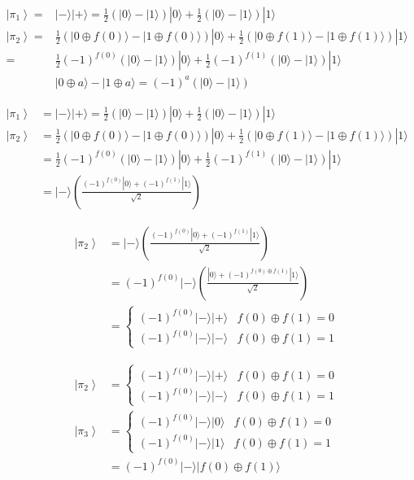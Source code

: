 \documentclass{book}
\begin{document}
$$
\begin{aligned}
	\left|\pi_1\right\rangle= & |-\rangle|+\rangle=\frac{1}{2}(|0\rangle-|1\rangle)|0\rangle+\frac{1}{2}(|0\rangle-|1\rangle)|1\rangle \\
	\left|\pi_2\right\rangle= & \frac{1}{2}(|0 \oplus f(0)\rangle-|1 \oplus f(0)\rangle)|0\rangle+\frac{1}{2}(|0 \oplus f(1)\rangle-|1 \oplus f(1)\rangle)|1\rangle \\
	= & \frac{1}{2}(-1)^{f(0)}(|0\rangle-|1\rangle)|0\rangle+\frac{1}{2}(-1)^{f(1)}(|0\rangle-|1\rangle)|1\rangle \\
	& |0 \oplus a\rangle-|1 \oplus a\rangle=(-1)^a(|0\rangle-|1\rangle)
\end{aligned}
$$

$$
\begin{aligned}
	\left|\pi_1\right\rangle & =|-\rangle|+\rangle=\frac{1}{2}(|0\rangle-|1\rangle)|0\rangle+\frac{1}{2}(|0\rangle-|1\rangle)|1\rangle \\
	\left|\pi_2\right\rangle & =\frac{1}{2}(|0 \oplus f(0)\rangle-|1 \oplus f(0)\rangle)|0\rangle+\frac{1}{2}(|0 \oplus f(1)\rangle-|1 \oplus f(1)\rangle)|1\rangle \\
	& =\frac{1}{2}(-1)^{f(0)}(|0\rangle-|1\rangle)|0\rangle+\frac{1}{2}(-1)^{f(1)}(|0\rangle-|1\rangle)|1\rangle \\
	& =|-\rangle\left(\frac{(-1)^{f(0)}|0\rangle+(-1)^{f(1)}|1\rangle}{\sqrt{2}}\right)
\end{aligned}
$$

$$
\begin{aligned}
	\left|\pi_2\right\rangle & =|-\rangle\left(\frac{(-1)^{f(0)}|0\rangle+(-1)^{f(1)}|1\rangle}{\sqrt{2}}\right) \\
	& =(-1)^{f(0)}|-\rangle\left(\frac{|0\rangle+(-1)^{f(0) \oplus f(1)}|1\rangle}{\sqrt{2}}\right) \\
	& = \begin{cases}(-1)^{f(0)}|-\rangle|+\rangle & f(0) \oplus f(1)=0 \\
		(-1)^{f(0)}|-\rangle|-\rangle & f(0) \oplus f(1)=1\end{cases}
\end{aligned}
$$


$$
\begin{aligned}
	\left|\pi_2\right\rangle & = \begin{cases}(-1)^{f(0)}|-\rangle|+\rangle & f(0) \oplus f(1)=0 \\
		(-1)^{f(0)}|-\rangle|-\rangle & f(0) \oplus f(1)=1\end{cases} \\
	\left|\pi_3\right\rangle & = \begin{cases}(-1)^{f(0)}|-\rangle|0\rangle & f(0) \oplus f(1)=0 \\
		(-1)^{f(0)}|-\rangle|1\rangle & f(0) \oplus f(1)=1\end{cases} \\
	& =(-1)^{f(0)}|-\rangle|f(0) \oplus f(1)\rangle
\end{aligned}
$$
\end{document}
